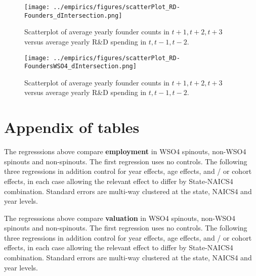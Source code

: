 \documentclass[12pt,english]{article}
\theoremstyle{remark}
\begin{document}
\begin{figure}[!htb]
	\centering
	\texttt{[image: ../empirics/figures/scatterPlot\_RD-Founders\_dIntersection.png]}
	\caption{Scatterplot of average yearly founder counts in $t+1,t+2,t+3$ versus average yearly R\&D spending in $t,t-1,t-2$.}
	\label{figure:scatterPlot_RD-Founders_dIntersection}
\end{figure}

\begin{figure}[!htb]
	\centering
	\texttt{[image: ../empirics/figures/scatterPlot\_RD-FoundersWSO4\_dIntersection.png]}
	\caption{Scatterplot of average yearly founder counts in $t+1,t+2,t+3$ versus average yearly R\&D spending in $t,t-1,t-2$.}
	\label{figure:scatterPlot_RD-FoundersWSO4_dIntersection}
\end{figure}

\pagebreak

\section{Appendix of tables}





\begin{table}[!htb]
	\footnotesize
	\centering
	
	\caption{The regresssions above compare \textbf{employment} in WSO4 spinouts, non-WSO4 spinouts and non-spinouts. The first regression uses no controls. The following three regressions in addition control for year effects, age effects, and / or cohort effects, in each case allowing the relevant effect to differ by State-NAICS4 combination. Standard errors are multi-way clustered at the state, NAICS4 and year levels.}
	\label{table:startupLifeCycle_founder2founders_regs_lemployeecount_overall}
\end{table}

\begin{table}[!htb]
	\footnotesize
	\centering
	
	\caption{The regresssions above compare \textbf{valuation} in WSO4 spinouts, non-WSO4 spinouts and non-spinouts. The first regression uses no controls. The following three regressions in addition control for year effects, age effects, and / or cohort effects, in each case allowing the relevant effect to differ by State-NAICS4 combination. Standard errors are multi-way clustered at the state, NAICS4 and year levels.}
	\label{table:startupLifeCycle_founder2founders_regs_lPostValUSD_overall}
\end{table}
\end{document}
